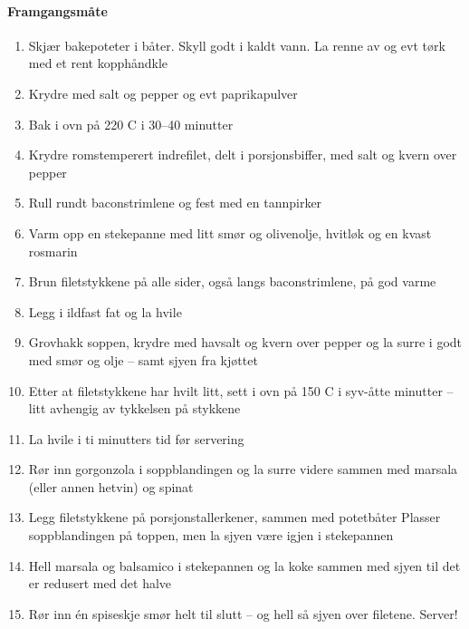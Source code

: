 \documentclass[12pt,a4paper]{book}
\begin{document}
\paragraph{Framgangsmåte}
\begin{enumerate}[noitemsep]
	\item Skjær bakepoteter i båter. Skyll godt i kaldt vann. La renne av og evt tørk med et rent kopphåndkle
	\item Krydre med salt og pepper og evt paprikapulver
	\item Bak i ovn på 220 \degree C i 30--40 minutter
	\item Krydre romstemperert indrefilet, delt i porsjonsbiffer, med salt og kvern over pepper
	\item Rull rundt baconstrimlene og fest med en tannpirker
	\item Varm opp en stekepanne med litt smør og olivenolje, hvitløk og en kvast rosmarin
	\item Brun filetstykkene på alle sider, også langs baconstrimlene, på god varme
	\item Legg i ildfast fat og la hvile
	\item Grovhakk soppen, krydre med havsalt og kvern over pepper og la surre i godt med smør og olje – samt sjyen fra kjøttet
	\item Etter at filetstykkene har hvilt litt, sett i ovn på 150 \degree C i syv-åtte minutter – litt avhengig av tykkelsen på stykkene
	\item La hvile i ti minutters tid før servering
	\item Rør inn gorgonzola i soppblandingen og la surre videre sammen med marsala (eller annen hetvin) og spinat
	\item Legg filetstykkene på porsjonstallerkener, sammen med potetbåter Plasser soppblandingen på toppen, men la sjyen være igjen i stekepannen
	\item Hell marsala og balsamico i stekepannen og la koke sammen med sjyen til det er redusert med det halve
	\item Rør inn én spiseskje smør helt til slutt – og hell så sjyen over filetene. Server!
\end{enumerate}
\end{document}
